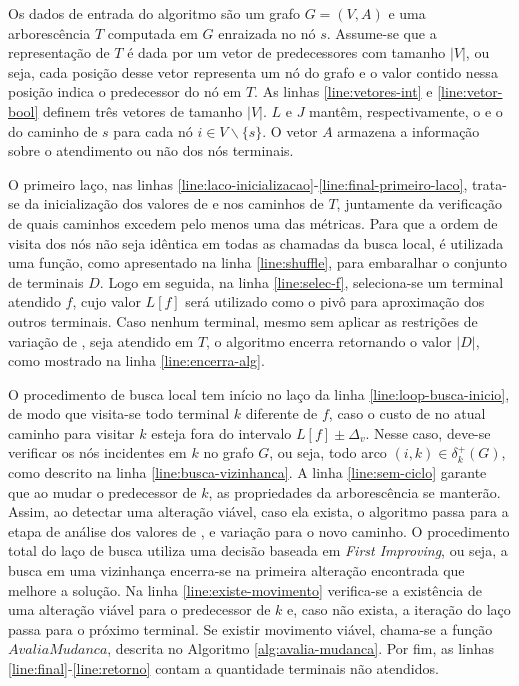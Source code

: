 Os dados de entrada  do algoritmo são um grafo $G = (V,  A)$ e uma arborescência
$T$ computada em $G$ enraizada no nó $s$. Assume-se que a representação de $T$ é
dada por  um vetor  de predecessores  com tamanho $|V|$,  ou seja,  cada posição
desse vetor representa um  nó do grafo e o valor contido  nessa posição indica o
predecessor   do    nó   em   $T$.   As    linhas   \eqref{line:vetores-int}   e
\eqref{line:vetor-bool} definem três vetores de tamanho $|V|$. $L$ e $J$ mantêm,
respectivamente, o {\delay} e o {\jitter} do  caminho de $s$ para cada nó $i \in
V\backslash\{s\}$. O vetor $A$ armazena a  informação sobre o atendimento ou não
dos nós terminais.

O              primeiro               laço,              nas              linhas
\eqref{line:laco-inicializacao}-\eqref{line:final-primeiro-laco},   trata-se  da
inicialização  dos  valores  de  {\delay}  e  {\jitter}  nos  caminhos  de  $T$,
juntamente da verificação de quais caminhos excedem pelo menos uma das métricas.
Para que  a ordem de visita  dos nós não seja  idêntica em todas as  chamadas da
busca   local,   é   utilizada   uma   função,   como   apresentado   na   linha
\eqref{line:shuffle},  para embaralhar  o  conjunto de  terminais  $D$. Logo  em
seguida, na  linha \eqref{line:selec-f}, seleciona-se um  terminal atendido $f$,
cujo  valor $L[f]$  será  utilizado  como o  pivô  para  aproximação dos  outros
terminais. Caso nenhum terminal, mesmo sem  aplicar as restrições de variação de
{\delay}, seja  atendido em $T$, o  algoritmo encerra retornando o  valor $|D|$,
como mostrado na linha \eqref{line:encerra-alg}.

O   procedimento    de   busca   local    tem   início   no   laço    da   linha
\eqref{line:loop-busca-inicio},  de   modo  que  visita-se  todo   terminal  $k$
diferente de  $f$, caso o  custo de {\delay} no  atual caminho para  visitar $k$
esteja fora do  intervalo $L[f] \pm \Delta_v$. Nesse caso,  deve-se verificar os
nós  incidentes  em  $k$  no  grafo  $G$,   ou  seja,  todo  arco  $(i,  k)  \in
\delta_{k}^{+}(G)$,  como  descrito  na linha  \eqref{line:busca-vizinhanca}.  A
linha  \eqref{line:sem-ciclo} garante  que ao  mudar  o predecessor  de $k$,  as
propriedades  da arborescência  se manterão.  Assim, ao  detectar uma  alteração
viável, caso ela exista,  o algoritmo passa para a etapa  de análise dos valores
de {\delay}, {\jitter}  e variação para o novo caminho.  O procedimento total do
laço de busca utiliza  uma decisão baseada em {\em First  Improving}, ou seja, a
busca em uma vizinhança encerra-se  na primeira alteração encontrada que melhore
a solução.  Na linha  \eqref{line:existe-movimento} verifica-se a  existência de
uma alteração viável para o predecessor de $k$ e, caso não exista, a iteração do
laço passa  para o  próximo terminal.  Se existir  movimento viável,  chama-se a
função $AvaliaMudanca$, descrita no Algoritmo \ref{alg:avalia-mudanca}. Por fim,
as linhas \eqref{line:final}-\eqref{line:retorno}  contam a quantidade terminais
não atendidos.

